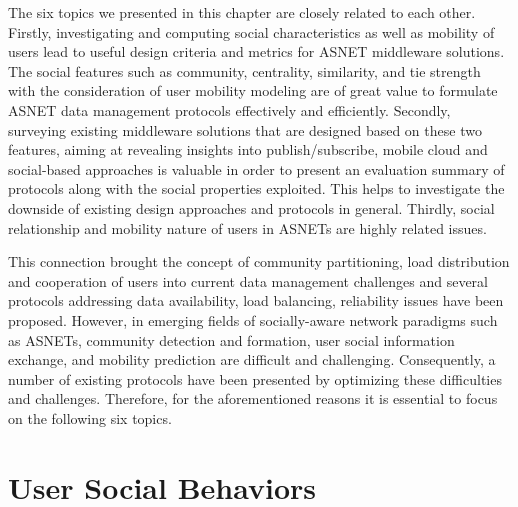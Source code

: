 The six topics we presented in this chapter are closely related to each other. Firstly, investigating and computing social characteristics as well as mobility of users lead to useful design criteria and metrics for ASNET middleware solutions. The social features such as community, centrality, similarity, and tie strength with the consideration of user mobility modeling are of great value to formulate ASNET data management protocols effectively and efficiently. Secondly, surveying existing middleware solutions that are designed based on these two features, aiming at revealing insights into publish/subscribe, mobile cloud and social-based approaches is valuable in order to present an evaluation summary of protocols along with the social properties exploited. This helps to investigate the downside of existing design approaches and protocols in general.  Thirdly, social relationship and mobility nature of users in ASNETs are highly related issues.

This connection brought the concept of community partitioning, load distribution and cooperation of users into current data management challenges and several protocols addressing data availability, load balancing, reliability issues have been proposed.  However, in emerging fields of socially-aware network paradigms such as ASNETs, community detection and formation, user social information exchange, and mobility prediction are difficult and challenging. Consequently, a number of existing protocols have been presented by optimizing these difficulties and challenges. Therefore, for the aforementioned reasons it is essential to focus on the following six topics.

\section{User Social Behaviors}\label{Chap2_01}

